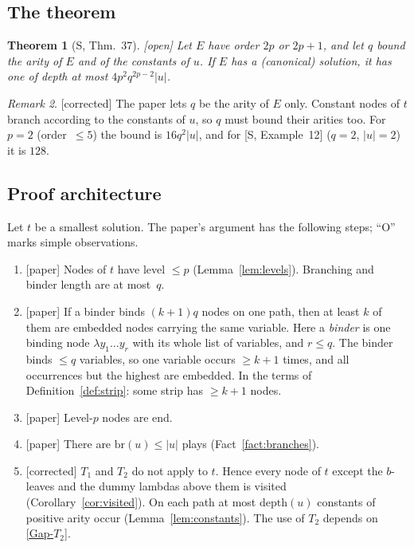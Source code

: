 \documentclass[11pt]{article}
\newcommand{\depth}{\mathrm{depth}}
\newcommand{\br}{\mathrm{br}}
\newcommand{\Paper}{\textsf{[paper]}}
\newcommand{\Fixed}{\textsf{[corrected]}}
\newcommand{\Open}{\textsf{\color{red!60!black}[open]}}
\theoremstyle{plain}
\newtheorem{theorem}{Theorem}[section]
\theoremstyle{definition}
\theoremstyle{remark}
\newtheorem{remark}[theorem]{Remark}
\newcommand{\GapTtwo}{\hyperref[gap:T2]{[Gap-$T_2$]}}
\begin{document}
\subsection{The theorem}



\begin{theorem}[S, Thm.~37]\label{thm:small}
\Open{} Let $E$ have order $2p$ or $2p+1$, and let $q$ bound the arity
of $E$ \emph{and of the constants of $u$}.  If $E$ has a (canonical)
solution, it has one of depth at most $4p^2q^{2p-2}|u|$.
\end{theorem}

\begin{remark}
\Fixed{} The paper lets $q$ be the arity of $E$ only.  Constant nodes of
$t$ branch according to the constants of $u$, so $q$ must bound their
arities too.  For $p=2$ (order~$\le5$) the bound is $16q^2|u|$, and for
[S, Example~12] ($q=2$, $|u|=2$) it is $128$.
\end{remark}

\subsection{Proof architecture}\label{sec:architecture}

Let $t$ be a smallest solution.  The paper's argument has the following
steps; ``O'' marks simple observations.

\begin{enumerate}[{O}1.]
\item \Paper{} Nodes of $t$ have level $\le p$ (Lemma~\ref{lem:levels}).
  Branching and binder length are at most~$q$.
\item \Paper{} If a binder binds $(k+1)q$ nodes on one path, then at
  least $k$ of them are embedded nodes carrying the same variable.  Here
  a \emph{binder} is one binding node $\lambda y_1\dots y_r$ with its whole
  list of variables, and $r\le q$.  The binder binds $\le q$ variables, so one variable occurs $\ge k+1$
  times, and all occurrences but the highest are embedded.  In the
  terms of Definition~\ref{def:strip}: some strip has $\ge k+1$
  nodes.
\item \Paper{} Level-$p$ nodes are end.
\item \Paper{} There are $\br(u)\le|u|$ plays (Fact~\ref{fact:branches}).
\item \Fixed{} $T_1$ and $T_2$ do not apply to $t$.  Hence every node
  of $t$ except the $b$-leaves and the dummy lambdas above them is
  visited (Corollary~\ref{cor:visited}).  On each path at most
  $\depth(u)$ constants of positive arity occur
  (Lemma~\ref{lem:constants}).  The use of $T_2$ depends on
  \GapTtwo{}.
\end{enumerate}
\end{document}
